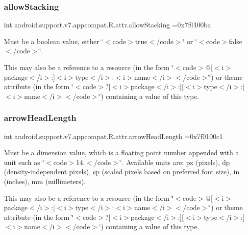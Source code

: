 \subsubsection{\texorpdfstring{allow\+Stacking}{allowStacking}}
{\footnotesize\ttfamily int android.\+support.\+v7.\+appcompat.\+R.\+attr.\+allow\+Stacking =0x7f0100ba\hspace{0.3cm}{\ttfamily [static]}}

Must be a boolean value, either \char`\"{}$<$code$>$true$<$/code$>$\char`\"{} or \char`\"{}$<$code$>$false$<$/code$>$\char`\"{}. 

This may also be a reference to a resource (in the form \char`\"{}$<$code$>$@\mbox{[}$<$i$>$package$<$/i$>$\+:\mbox{]}$<$i$>$type$<$/i$>$\+:$<$i$>$name$<$/i$>$$<$/code$>$\char`\"{}) or theme attribute (in the form \char`\"{}$<$code$>$?\mbox{[}$<$i$>$package$<$/i$>$\+:\mbox{]}\mbox{[}$<$i$>$type$<$/i$>$\+:\mbox{]}$<$i$>$name$<$/i$>$$<$/code$>$\char`\"{}) containing a value of this type. \mbox{\label{classandroid_1_1support_1_1v7_1_1appcompat_1_1R_1_1attr_aeb28b87d979ed4affb228d5f5e913393}} 
\subsubsection{\texorpdfstring{arrow\+Head\+Length}{arrowHeadLength}}
{\footnotesize\ttfamily int android.\+support.\+v7.\+appcompat.\+R.\+attr.\+arrow\+Head\+Length =0x7f0100c1\hspace{0.3cm}{\ttfamily [static]}}

Must be a dimension value, which is a floating point number appended with a unit such as \char`\"{}$<$code$>$14.\+5sp$<$/code$>$\char`\"{}. Available units are\+: px (pixels), dp (density-\/independent pixels), sp (scaled pixels based on preferred font size), in (inches), mm (millimeters). 

This may also be a reference to a resource (in the form \char`\"{}$<$code$>$@\mbox{[}$<$i$>$package$<$/i$>$\+:\mbox{]}$<$i$>$type$<$/i$>$\+:$<$i$>$name$<$/i$>$$<$/code$>$\char`\"{}) or theme attribute (in the form \char`\"{}$<$code$>$?\mbox{[}$<$i$>$package$<$/i$>$\+:\mbox{]}\mbox{[}$<$i$>$type$<$/i$>$\+:\mbox{]}$<$i$>$name$<$/i$>$$<$/code$>$\char`\"{}) containing a value of this type. \mbox{\label{classandroid_1_1support_1_1v7_1_1appcompat_1_1R_1_1attr_a067b24dda9f091a098650a5006514996}} 
